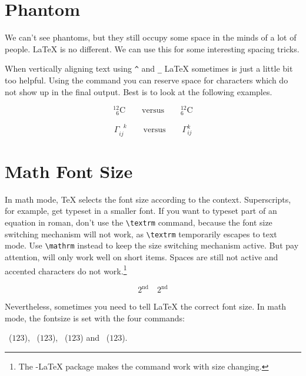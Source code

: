 \section{Phantom}

We can't see phantoms, but they still occupy some space in the minds of a
lot of people. \LaTeX{} is no different. We can use this for
some interesting spacing tricks.

When vertically aligning text using \verb|^| and \verb|_| \LaTeX{} sometimes
is just a little bit too helpful. Using the  command you can
reserve space for characters which do not show up in the final output. Best
is to look at the following examples.
\begin{example}
\begin{displaymath}
{}^{12}_{\phantom{1}6}\textrm{C}
\qquad \textrm{versus} \qquad
{}^{12}_{6}\textrm{C}
\end{displaymath}
\end{example}
\begin{example}
\begin{displaymath} 
\Gamma_{ij}^{\phantom{ij}k}
\qquad \textrm{versus} \qquad
\Gamma_{ij}^{k}
\end{displaymath}  
\end{example}

\section{Math Font Size}

 In math mode, \TeX{} selects the font size
according to the context. Superscripts, for example, get typeset in a
smaller font. If you want to typeset part of an equation in roman,
don't use the \verb|\textrm| command, because the font size switching
mechanism will not work, as \verb|\textrm| temporarily escapes to text
mode. Use \verb|\mathrm| instead to keep the size switching mechanism
active. But pay attention,  will only work well on short
items. Spaces are still not active and accented characters do not
work.\footnote{The \AmS-\LaTeX{} package makes the  command
  work with size changing.}
\begin{example}
\begin{equation}
2^{\textrm{nd}} \quad 
2^{\mathrm{nd}}
\end{equation}
\end{example}

Nevertheless, sometimes you need to tell \LaTeX{} the correct font
size. In math mode, the fontsize is set with the four commands:
\begin{flushleft}
~($\displaystyle 123$),
 ~($\textstyle 123$), 
~($\scriptstyle 123$) and
~($\scriptscriptstyle 123$).
\end{flushleft}

